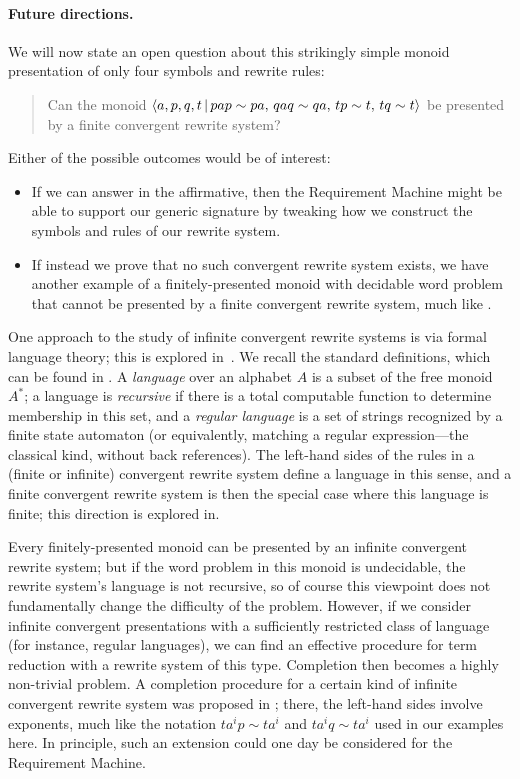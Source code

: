 \documentclass[../generics]{subfiles}
\begin{document}
\begin{example}
\paragraph{Future directions.} We will now state an open question about this strikingly simple monoid presentation of only four symbols and rewrite rules:
\begin{quote}
Can the monoid $\langle a,p,q,t\,|\,pap\sim pa,\, qaq\sim qa,\, tp\sim t,\, tq\sim t\rangle$ be presented by a finite convergent rewrite system?
\end{quote}
Either of the possible outcomes would be of interest:
\begin{itemize}
\item If we can answer in the affirmative, then the Requirement Machine might be able to support our generic signature by tweaking how we construct the symbols and rules of our rewrite system.
\item If instead we prove that no such convergent rewrite system exists, we have another example of a finitely-presented monoid with decidable word problem that cannot be presented by a finite convergent rewrite system, much like .
\end{itemize}

One approach to the study of infinite convergent rewrite systems is via formal language theory; this is explored in~\cite{OTTO1998621}. We recall the standard definitions, which can be found in \cite{formalmans1}. A \emph{language} over an alphabet $A$ is a subset of the free monoid $A^*$; a language is \emph{recursive} if there is a total computable function to determine membership in this set, and a \emph{regular language} is a set of strings recognized by a finite state automaton (or equivalently, matching a regular expression---the classical kind, without back references). The left-hand sides of the rules in a (finite or infinite) convergent rewrite system define a language in this sense, and a finite convergent rewrite system is then the special case where this language is finite; this direction is explored in.

Every finitely-presented monoid can be presented by an infinite convergent rewrite system; but if the word problem in this monoid is undecidable, the rewrite system's language is not recursive, so of course this viewpoint does not fundamentally change the difficulty of the problem. However, if we consider infinite convergent presentations with a sufficiently restricted class of language (for instance, regular languages), we can find an effective procedure for term reduction with a rewrite system of this type. Completion then becomes a highly non-trivial problem. A completion procedure for a certain kind of infinite convergent rewrite system was proposed in \cite{NEEDHAM1996195}; there, the left-hand sides involve exponents, much like the notation $ta^ip\sim ta^i$ and $ta^iq\sim ta^i$ used in our examples here. In principle, such an extension could one day be considered for the Requirement Machine.
\end{example}
\end{document}

